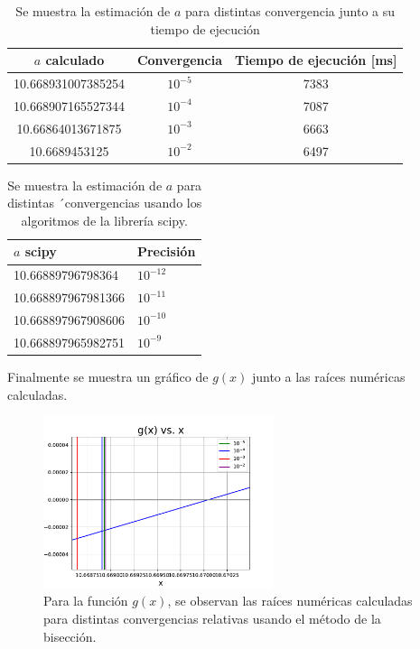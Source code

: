 \documentclass[letterpaper,oneside]{article}
\begin{document}
 \begin{table}
\begin{tabular}{|c|c|c|}
\hline
\textbf{$a$ calculado}          & \textbf{Convergencia} & \textbf{Tiempo de ejecución {[}ms{]}} \\ \hline
10.668931007385254 & $10^{-5}$          & 7383                                  \\ \hline
10.668907165527344 & $10^{-4}$          & 7087                                  \\ \hline
10.66864013671875  & $10^{-3}$          & 6663                                  \\ \hline
10.6689453125      & $10^{-2}$          & 6497                                  \\ \hline
\end{tabular}
\caption{Se muestra la estimación de $a$ para distintas convergencia junto a su tiempo de ejecución}
\end{table}

\begin{table}
\begin{tabular}{|l|l|}
\hline
\textbf{$a$ scipy} & \textbf{Precisión}            \\ \hline
10.66889796798364  & $10^{-12}$ \\ \hline
10.668897967981366 & $10^{-11}$                    \\ \hline
10.668897967908606 & $10^{-10}$                    \\ \hline
10.668897965982751 & $10^{-9}$                     \\ \hline
\end{tabular}
\caption{Se muestra la estimación de $a$ para distintas ´convergencias usando los algoritmos de la librería scipy.}
\end{table}
Finalmente se muestra un gráfico de $g(x)$ junto a las raíces numéricas calculadas.
\begin{figure}
    \centering    
    \includegraphics[width=0.6\textwidth]{grafico g(x) con raices numericas con zoom.pdf}
    \caption{Para la función $g(x)$, se observan las raíces numéricas calculadas para distintas convergencias relativas usando el método de la bisección.}
    \label{grafico de g con raices y zoom}
\end{figure}{}
\newpage
\end{document}
